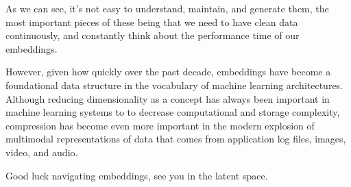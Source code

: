 \documentclass[draft, 11pt]{diazessay} %
\begin{document}
As we can see, it's not easy to understand, maintain, and generate them, the most important pieces of these being that we need to have clean data continuously, and constantly think about the performance time of our embeddings. 

However, given how quickly over the past decade, embeddings have become a foundational data structure in the vocabulary of machine learning architectures. Although reducing dimensionality as a concept has always been important in machine learning systems to to decrease computational and storage complexity, compression has become even more important in the modern explosion of multimodal representations of data that comes from application log files, images, video, and audio. 

Good luck navigating embeddings,  see you in the latent space. 


\newpage


\newpage



\end{document}
